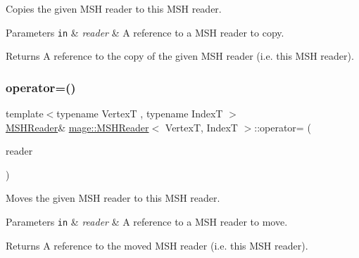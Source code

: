 Copies the given M\+SH reader to this M\+SH reader.


\begin{DoxyParams}[1]{Parameters}
\mbox{\tt in}  & {\em reader} & A reference to a M\+SH reader to copy. \\
\hline
\end{DoxyParams}
\begin{DoxyReturn}{Returns}
A reference to the copy of the given M\+SH reader (i.\+e. this M\+SH reader). 
\end{DoxyReturn}
\hypertarget{classmage_1_1_m_s_h_reader_a0f014d780eaa5477aa7206db51fede2f}{}\label{classmage_1_1_m_s_h_reader_a0f014d780eaa5477aa7206db51fede2f} 
\subsubsection{\texorpdfstring{operator=()}{operator=()}\hspace{0.1cm}{\footnotesize\ttfamily [2/2]}}
{\footnotesize\ttfamily template$<$typename VertexT , typename IndexT $>$ \\
\hyperlink{classmage_1_1_m_s_h_reader}{M\+S\+H\+Reader}\& \hyperlink{classmage_1_1_m_s_h_reader}{mage\+::\+M\+S\+H\+Reader}$<$ VertexT, IndexT $>$\+::operator= (\begin{DoxyParamCaption}\item[{\hyperlink{classmage_1_1_m_s_h_reader}{M\+S\+H\+Reader}$<$ VertexT, IndexT $>$ \&\&}]{reader }\end{DoxyParamCaption})\hspace{0.3cm}{\ttfamily [delete]}}

Moves the given M\+SH reader to this M\+SH reader.


\begin{DoxyParams}[1]{Parameters}
\mbox{\tt in}  & {\em reader} & A reference to a M\+SH reader to move. \\
\hline
\end{DoxyParams}
\begin{DoxyReturn}{Returns}
A reference to the moved M\+SH reader (i.\+e. this M\+SH reader). 
\end{DoxyReturn}
\hypertarget{classmage_1_1_m_s_h_reader_a26b60060bf61183fb5758a4725c6a205}{}\label{classmage_1_1_m_s_h_reader_a26b60060bf61183fb5758a4725c6a205} 
